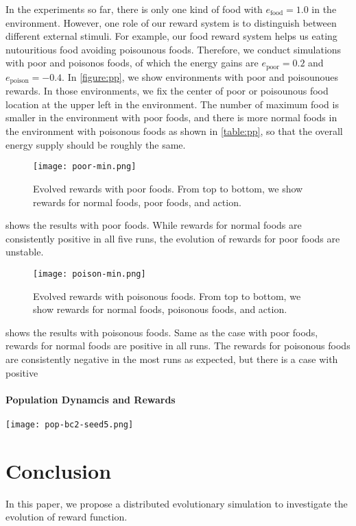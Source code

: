 In the experiments so far, there is only one kind of food with $e_{\mathrm{food}} = 1.0$ in the environment. However, one role of our reward system is to distinguish between different external stimuli. For example, our food reward system helps us eating nutouritious food avoiding poisounous foods. Therefore, we conduct simulations with poor and poisonos foods, of which the energy gains are $e_{\mathrm{poor}} = 0.2$ and $e_{\mathrm{poison}} = -0.4$. In \cref{figure:pp}, we show environments with poor and poisounoues rewards. In those environments, we fix the center of poor or poisounous food location at the upper left in the environment. The number of maximum food is smaller in the environment with poor foods, and there is more normal foods in the environment with poisonous foods as shown in \cref{table:pp}, so that the overall energy supply should be roughly the same.

\begin{figure}[ht]
  \centering
  \texttt{[image: poor-min.png]}
  \caption{
    Evolved rewards with poor foods.
    From top to bottom, we show rewards for normal foods, poor foods, and action.
  }\label{figure:result-poor}
\end{figure}

 shows the results with poor foods. While rewards for normal foods are consistently positive in all five runs, the evolution of rewards for poor foods are unstable.

\begin{figure}[ht]
  \centering
  \texttt{[image: poison-min.png]}
  \caption{
    Evolved rewards with poisonous foods.
    From top to bottom, we show rewards for normal foods, poisonous foods, and action.
  }\label{figure:result-poison}
\end{figure}

 shows the results with poisonous foods. Same as the case with poor foods, rewards for normal foods are positive in all runs. The rewards for poisonous foods are consistently negative in the most runs as expected, but there is a case with positive


\paragraph{Population Dynamcis and Rewards}
\begin{figure*}[t]
  \centering
  \texttt{[image: pop-bc2-seed5.png]}
  \caption{}\label{figure:result-population}
\end{figure*}

\section{Conclusion}
In this paper, we propose a distributed evolutionary simulation to investigate the evolution of reward function.